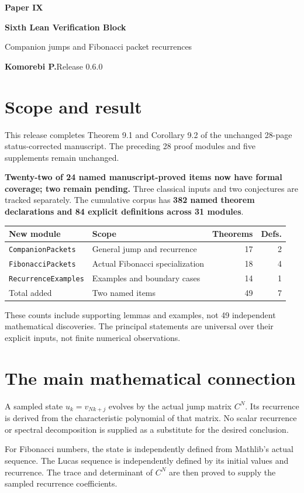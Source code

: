 \documentclass[11pt]{article}
\begin{document}
{\LARGE\bfseries\color{ink}Paper IX}\par
{\Large\bfseries Sixth Lean Verification Block}\par
{\large Companion jumps and Fibonacci packet recurrences}\par
\textbf{Komorebi P.}\hfill Release 0.6.0
\bigskip
\section*{Scope and result}
This release completes Theorem 9.1 and Corollary 9.2 of the unchanged 28-page status-corrected manuscript. The preceding 28 proof modules and five supplements remain unchanged.

\textbf{Twenty-two of 24 named manuscript-proved items now have formal coverage; two remain pending.} Three classical inputs and two conjectures are tracked separately. The cumulative corpus has \textbf{382 named theorem declarations and 84 explicit definitions across 31 modules}.

\begin{center}
\begin{tabular}{@{}p{}p{}rr@{}}
\toprule
New module & Scope & Theorems & Defs.\\\midrule
\texttt{CompanionPackets} & General jump and recurrence & 17 & 2\\
\texttt{FibonacciPackets} & Actual Fibonacci specialization & 18 & 4\\
\texttt{RecurrenceExamples} & Examples and boundary cases & 14 & 1\\\midrule
Total added & Two named items & 49 & 7\\\bottomrule
\end{tabular}
\end{center}
These counts include supporting lemmas and examples, not 49 independent mathematical discoveries. The principal statements are universal over their explicit inputs, not finite numerical observations.

\section*{The main mathematical connection}
A sampled state $u_k=v_{Nk+j}$ evolves by the actual jump matrix $C^N$. Its recurrence is derived from the characteristic polynomial of that matrix. No scalar recurrence or spectral decomposition is supplied as a substitute for the desired conclusion.

For Fibonacci numbers, the state is independently defined from Mathlib's actual sequence. The Lucas sequence is independently defined by its initial values and recurrence. The trace and determinant of $C^N$ are then proved to supply the sampled recurrence coefficients.
\end{document}
